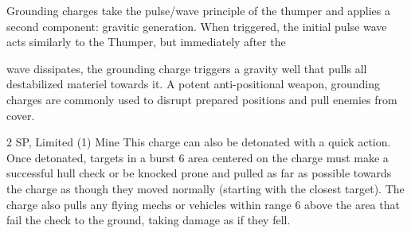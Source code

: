 Grounding charges take the pulse/wave principle of the thumper and applies a second component: gravitic  
generation. When triggered, the initial pulse wave acts similarly to the Thumper, but immediately after the  

wave dissipates, the grounding charge triggers a gravity well that pulls all destabilized materiel towards it. A  
potent anti-positional weapon, grounding charges are commonly used to disrupt prepared positions and  
pull enemies from cover.   

2 SP, Limited (1)  
Mine  
This charge can also be detonated with a quick action. Once detonated, targets in a burst 6 area  
centered on the charge must make a successful hull check or be knocked prone and pulled as  
far as possible towards the charge as though they moved normally (starting with the closest  
target). The charge also pulls any flying mechs or vehicles within range 6 above the area that fail  
the check to the ground, taking damage as if they fell.
 
